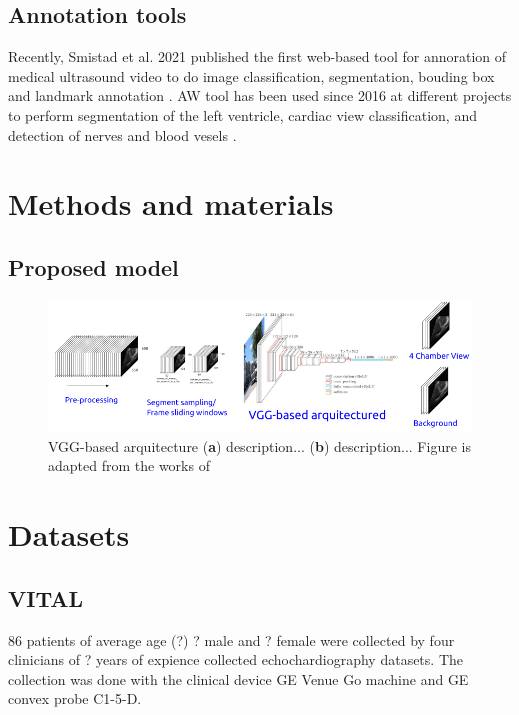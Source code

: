 \subsection{Annotation tools}
Recently, Smistad et al. 2021 published the first web-based tool for annoration of medical ultrasound video to do image classification, segmentation, bouding box and landmark annotation  \cite{smistad2021-A-IUS}.
AW tool has been used since 2016 at different projects to perform segmentation of the left ventricle, cardiac view classification, and detection of nerves and blood vesels \cite{smistad2021-A-IUS}.

\section{Methods and materials}

\subsection{Proposed model}
\begin{figure}[h]
\centerline{
\includegraphics[width=\columnwidth]{../figures/VGG-based-arquitecture/versions/drawing-v00}
}
\caption{
	VGG-based arquitecture
	(\textbf{a}) description...
	(\textbf{b}) description...
	Figure is adapted from the works of %
}
\end{figure}



\section{Datasets}

\subsection{VITAL}
86 patients of average age (?) ? male and ? female were collected by four clinicians of ? years of expience collected echochardiography datasets.
The collection was done with the clinical device GE Venue Go machine and GE convex probe C1-5-D.

